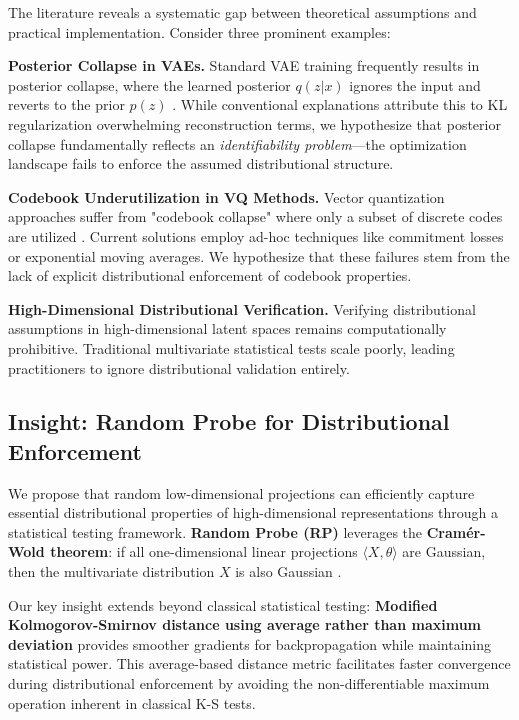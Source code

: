 \documentclass[11pt]{article}
\begin{document}
The literature reveals a systematic gap between theoretical assumptions and practical implementation. Consider three prominent examples:

\textbf{Posterior Collapse in VAEs.} Standard VAE training frequently results in posterior collapse, where the learned posterior $q(z|x)$ ignores the input and reverts to the prior $p(z)$ \cite{lucas2019dont,wang2023posterior}. While conventional explanations attribute this to KL regularization overwhelming reconstruction terms, we hypothesize that posterior collapse fundamentally reflects an \emph{identifiability problem}—the optimization landscape fails to enforce the assumed distributional structure.

\textbf{Codebook Underutilization in VQ Methods.} Vector quantization approaches suffer from "codebook collapse" where only a subset of discrete codes are utilized \cite{zheng2023online,fang2025enhancing}. Current solutions employ ad-hoc techniques like commitment losses or exponential moving averages. We hypothesize that these failures stem from the lack of explicit distributional enforcement of codebook properties.

\textbf{High-Dimensional Distributional Verification.} Verifying distributional assumptions in high-dimensional latent spaces remains computationally prohibitive. Traditional multivariate statistical tests scale poorly, leading practitioners to ignore distributional validation entirely.

\subsection{Insight: Random Probe for Distributional Enforcement}

We propose that random low-dimensional projections can efficiently capture essential distributional properties of high-dimensional representations through a statistical testing framework. \textbf{Random Probe (RP)} leverages the \textbf{Cramér-Wold theorem}: if all one-dimensional linear projections $\langle X,\theta \rangle$ are Gaussian, then the multivariate distribution $X$ is also Gaussian \cite{fraiman2021application}.

Our key insight extends beyond classical statistical testing: \textbf{Modified Kolmogorov-Smirnov distance using average rather than maximum deviation} provides smoother gradients for backpropagation while maintaining statistical power. This average-based distance metric facilitates faster convergence during distributional enforcement by avoiding the non-differentiable maximum operation inherent in classical K-S tests.
\end{document}

